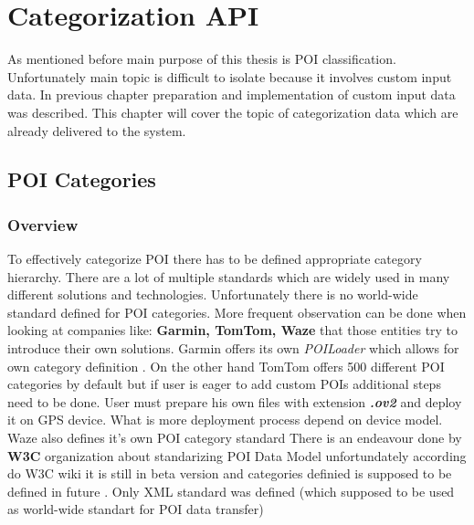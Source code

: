 \chapter{Categorization API}
As mentioned before main purpose of this thesis is POI classification. Unfortunately main topic is difficult to isolate because it involves custom input data. In previous chapter preparation and implementation of custom input data was described. This chapter will cover the topic of categorization data which are already delivered to the system.

\section{POI Categories}

\subsection{Overview}
To effectively categorize POI there has to be defined appropriate category hierarchy. There are a lot of multiple standards which are widely used in many different solutions and technologies. Unfortunately there is no world-wide standard defined for POI categories. More frequent observation can be done when looking at companies like: \textbf{Garmin, TomTom, Waze} that those entities try to introduce their own solutions. Garmin offers its own \textit{POILoader} which allows for own category definition \cite{9}. On the other hand TomTom offers 500 different POI categories by default \cite{10} but if user is eager to add custom POIs additional steps need to be done. User must prepare his own files with extension \textbf{\textit{.ov2}} and deploy it on GPS device. What is more deployment process depend on device model. Waze also defines it's own POI category standard \cite{14} There is an endeavour done by \textbf{W3C} organization about standarizing POI Data Model unfortundately according do W3C wiki it is still in beta version and categories definied is supposed to be defined in future \cite{12}. Only XML standard was defined (which supposed to be used as world-wide standart for POI data transfer) \cite{13}
